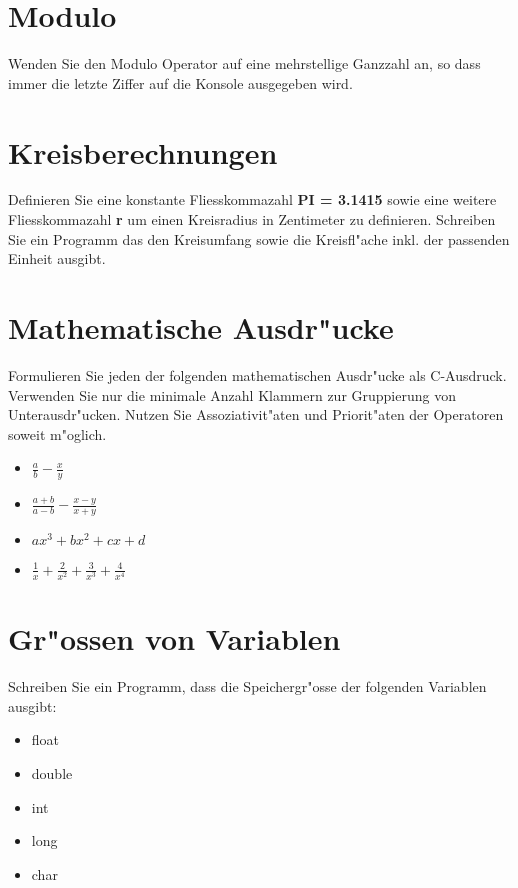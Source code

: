 \documentclass[a4paper,10pt]{article}
\begin{document}
\section{Modulo}
Wenden Sie den Modulo Operator auf eine mehrstellige Ganzzahl an, so dass immer die letzte Ziffer auf die Konsole ausgegeben wird.

\section{Kreisberechnungen}
Definieren Sie eine konstante Fliesskommazahl \textbf{PI = 3.1415} sowie eine weitere Fliesskommazahl \textbf{r} um einen Kreisradius in Zentimeter zu definieren. Schreiben Sie ein Programm das den Kreisumfang sowie die Kreisfl"ache inkl. der passenden Einheit ausgibt. 

\section{Mathematische Ausdr"ucke}
Formulieren Sie jeden der folgenden mathematischen Ausdr"ucke als
C-Ausdruck. Verwenden Sie nur die minimale Anzahl Klammern zur Gruppierung von
Unterausdr"ucken. Nutzen Sie Assoziativit"aten und Priorit"aten der Operatoren
soweit m"oglich.

\begin{itemize}
\item $\frac{a}{b} - \frac{x}{y}$

\item $\frac{a+b}{a-b} - \frac{x-y}{x+y}$

\item $ax^{3}+bx^{2}+cx+d$

\item $\frac{1}{x}+\frac{2}{x^{2}}+\frac{3}{x^{3}}+\frac{4}{x^{4}}$
\end{itemize}


\section{Gr"ossen von Variablen}
Schreiben Sie ein Programm, dass die Speichergr"osse der folgenden Variablen ausgibt:

\begin{itemize}
\item float
\item double
\item int
\item long
\item char
\end{itemize}
\end{document}

